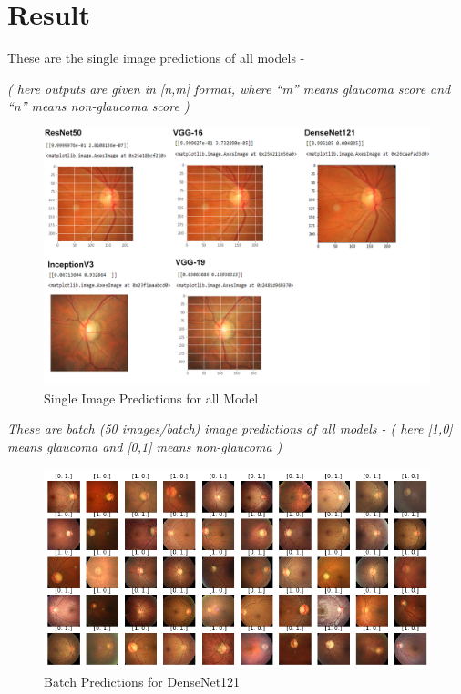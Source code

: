 \newpage
\section{Result}
These are the single image predictions of all models - 

\textit{( here outputs are given in [n,m] format, where “m” means glaucoma score and “n” means non-glaucoma score )}

\vspace{5mm}
\begin{figure}[hbt!]
\centering
\includegraphics[scale=0.6]{images/fig-53.png}
\caption{Single Image Predictions for all Model}
\label{fig:x Single Image Predictions for all Model}
\end{figure}

\newpage
\vspace{5mm}
\textit{These are batch (50 images/batch) image predictions of all models - ( here [1,0] means glaucoma and [0,1] means non-glaucoma )}


\vspace{5mm}
\begin{figure}[hbt!]
\centering
\includegraphics[scale=0.6]{images/fig-54.png}
\caption{Batch Predictions for DenseNet121}
\label{fig:x Batch Predictions for DenseNet121}
\end{figure}

